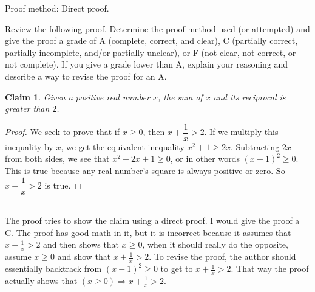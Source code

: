 \documentclass[12 pt]{exam}
\newtheorem{claim}{Claim}
\begin{document}
\begin{questions}
\begin{solution}
Proof method: Direct proof.
\end{solution}
	
\question Review the following proof. Determine the proof method used (or attempted) and give the proof a grade of A (complete, correct, and clear), C (partially correct, partially incomplete, and/or partially unclear), or F (not clear, not correct, or not complete). If you give a grade lower than A, explain your reasoning and describe a way to revise the proof for an A.
\begin{claim}
Given a positive real number $x$, the sum of $x$ and its reciprocal is greater than $2$.
\end{claim}
\begin{proof}
We seek to prove that if $x \geq 0$, then $x + \dfrac{1}{x} >2$. If we multiply this inequality by $x$, we get the equivalent inequality $x^2 + 1 \geq 2x$. Subtracting $2x$ from both sides, we see that $x^2 - 2x +1 \geq 0$, or in other words $(x-1)^2 \geq 0$. This is true because any real number's square is always positive or zero. So $x + \dfrac{1}{x} >2$ is true.
\end{proof}

\begin{solution}\\
    The proof tries to show the claim using a direct proof. I would give the proof a C. The proof has good math in it, but it is incorrect because it assumes that $x + \frac{1}{x} > 2$ and then shows that $x \ge 0$, when it should really do the opposite, assume $x \ge 0$ and show that $x + \frac{1}{x} > 2$. To revise the proof, the author should essentially backtrack from $(x-1)^2 \ge 0$ to get to $x + \frac{1}{x} > 2$. That way the proof actually shows that $(x \ge 0) \Rightarrow x + \frac{1}{x} > 2$.
\end{solution}

\end{questions}
\end{document}
